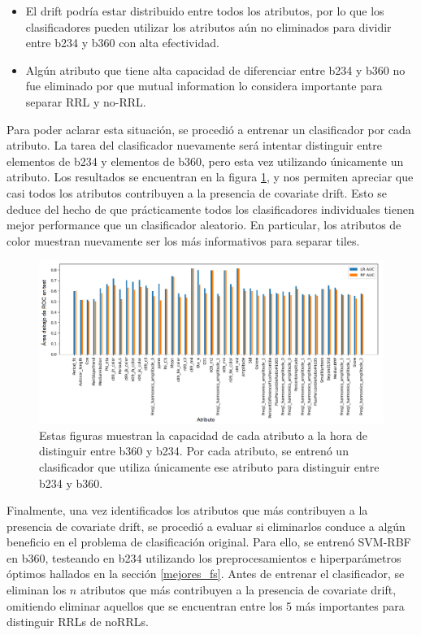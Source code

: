 \begin{itemize}
\item El drift podría estar distribuido entre todos los atributos, por lo que los clasificadores pueden utilizar los atributos aún no eliminados para dividir entre b234 y b360 con alta efectividad.
\item Algún atributo que tiene alta capacidad de diferenciar entre b234 y b360 no fue eliminado por que mutual information lo considera importante para separar RRL y no-RRL.
\end{itemize}

Para poder aclarar esta situación, se procedió a entrenar un clasificador por cada atributo. La tarea del clasificador nuevamente será intentar distinguir entre elementos de b234 y elementos de b360, pero esta vez utilizando únicamente un atributo. Los resultados se encuentran en la figura \ref{fig:covariate_ranking_single}, y nos permiten apreciar que casi todos los atributos contribuyen a la presencia de covariate drift. Esto se deduce del hecho de que prácticamente todos los clasificadores individuales tienen mejor performance que un clasificador aleatorio. En particular, los atributos de color muestran nuevamente ser los más informativos para separar tiles.  \\

\begin{figure}[h!]
\centering
  \includegraphics[width=\textwidth]{Kap8/shift_scores_single.png}
\caption{Estas figuras muestran la capacidad de cada atributo a la hora de distinguir entre b360 y b234. Por cada atributo, se entrenó un clasificador que utiliza únicamente ese atributo para distinguir entre b234 y b360. }
\label{fig:covariate_ranking_single}
\end{figure}

Finalmente, una vez identificados los atributos que más contribuyen a la presencia de covariate drift, se procedió a evaluar si eliminarlos conduce a algún beneficio en el problema de clasificación original. Para ello, se entrenó SVM-RBF en b360, testeando en b234 utilizando los preprocesamientos e hiperparámetros óptimos hallados en la sección \ref{mejores_fs}. Antes de entrenar el clasificador, se eliminan los $n$ atributos que más contribuyen a la presencia de covariate drift, omitiendo eliminar aquellos que se encuentran entre los 5 más importantes para distinguir RRLs de noRRLs.  \\

